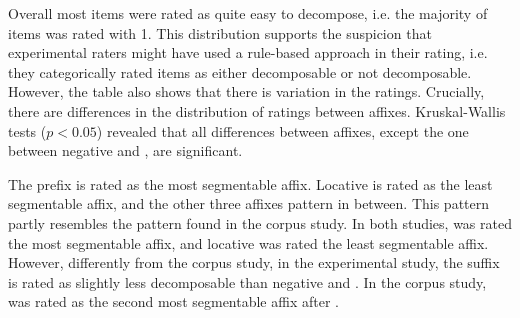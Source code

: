\begin{table}
	\caption{Semantic Transparency Rating  by affix\label{tbl:Exp distribution semantic transparency rating}}
\end{table}

Overall most  items were rated as quite easy to decompose, i.e. the majority of items was rated with 1. This distribution supports the suspicion that experimental raters might have used a rule-based approach in their rating, i.e. they categorically rated items as either decomposable or not decomposable. 
However, the table also shows that there is variation in the ratings. 
Crucially, there are differences in the distribution of ratings between affixes. Kruskal-Wallis tests ($p<0.05$) revealed that all differences between affixes, except the one between negative  and , are significant.



The prefix  is rated as the most segmentable affix. 
 Locative  is rated as the least segmentable affix, and the other three affixes pattern in between. 
  This pattern partly resembles the pattern found in the corpus study. In both studies,  was rated the most segmentable affix, and locative  was rated the least segmentable affix. 
 However, differently from the corpus study, in the experimental study, the suffix  is rated as slightly less decomposable than negative  and . In the corpus study,  was rated as the second most segmentable affix after .


